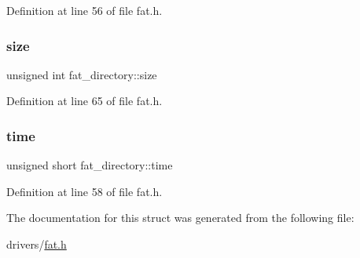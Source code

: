 Definition at line 56 of file fat.\+h.

\mbox{\label{a00061_a08766899120efa9bd031afe12edad492_a08766899120efa9bd031afe12edad492}} 
\subsubsection{\texorpdfstring{size}{size}}
{\footnotesize\ttfamily unsigned int fat\+\_\+directory\+::size}



Definition at line 65 of file fat.\+h.

\mbox{\label{a00061_a2bfa6f8f103ed1d1ecbab0bc2ed5b650_a2bfa6f8f103ed1d1ecbab0bc2ed5b650}} 
\subsubsection{\texorpdfstring{time}{time}}
{\footnotesize\ttfamily unsigned short fat\+\_\+directory\+::time}



Definition at line 58 of file fat.\+h.



The documentation for this struct was generated from the following file\+:\begin{DoxyCompactItemize}
\item 
drivers/\hyperlink{a00002}{fat.\+h}\end{DoxyCompactItemize}
